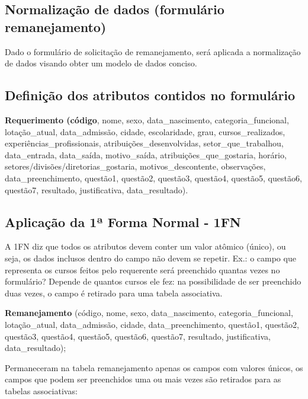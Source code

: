 \documentclass{article}
\begin{document}
\subsection{Normalização de dados (formulário remanejamento)}
Dado o formulário de solicitação de remanejamento, será aplicada a normalização de dados visando obter um modelo de dados conciso.

\subsection*{Definição dos atributos contidos no formulário}
\textbf{Requerimento (código}, nome, sexo, data\_nascimento, categoria\_funcional, lotação\_atual, data\_admissão, cidade, escolaridade, grau, cursos\_realizados, experiências\_profissionais, atribuições\_desenvolvidas, setor\_que\_trabalhou, data\_entrada, data\_saída, motivo\_saída, atribuições\_que\_gostaria, horário, setores/divisões/diretorias\_gostaria, motivos\_descontente, observações, data\_preenchimento, questão1, questão2, questão3, questão4, questão5, questão6, questão7, resultado, justificativa, data\_resultado).

\subsection{Aplicação da 1ª Forma Normal - 1FN}
A 1FN diz que todos os atributos devem conter um valor atômico (único), ou seja, os dados inclusos dentro do campo não devem se repetir. Ex.: o campo que representa os cursos feitos pelo requerente será preenchido quantas vezes no formulário? Depende de quantos cursos ele fez: na possibilidade de ser preenchido duas vezes, o campo é retirado para uma tabela associativa. 

\textbf{Remanejamento} (código, nome, sexo, data\_nascimento, categoria\_funcional, lotação\_atual, data\_admissão, cidade, data\_preenchimento, questão1, questão2, questão3, questão4, questão5, questão6, questão7, resultado, justificativa, data\_resultado);

Permaneceram na tabela remanejamento apenas os campos com valores únicos, os campos que podem ser preenchidos uma ou mais vezes são retirados para as tabelas associativas:
\end{document}
